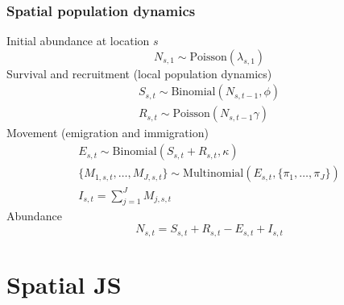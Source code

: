 \documentclass[color=usenames,dvipsnames]{beamer}\usepackage[]{graphicx}\usepackage[]{color}
\begin{document}
\begin{frame}
  \frametitle{Spatial population dynamics}
  \small
  {Initial abundance at location $s$}
  \[
    N_{s,1} \sim \mbox{Poisson}(\lambda_{s,1})
  \]
  \pause \vfill
  Survival and recruitment (local population dynamics)
  \begin{gather*}
    S_{s,t} \sim \mbox{Binomial}(N_{s,t-1}, \phi) \\
    R_{s,t} \sim \mbox{Poisson}(N_{s,t-1} \gamma)
  \end{gather*}
  \pause \vfill
  Movement (emigration and immigration)
  \begin{gather*}
    E_{s,t} \sim \mathrm{Binomial}(S_{s,t}+R_{s,t}, \kappa) \\
    \{M_{1,s,t}, \dots, M_{J,s,t}\} \sim \mathrm{Multinomial}(E_{s,t}, \{\pi_1, \dots, \pi_J\}) \\
    I_{s,t} = \sum_{j=1}^J M_{j,s,t}
  \end{gather*}
  \pause
  {Abundance}
  \[
    N_{s,t} = S_{s,t} + R_{s,t} - E_{s,t} + I_{s,t}
  \]
\end{frame}











\section{Spatial JS}
\end{document}
